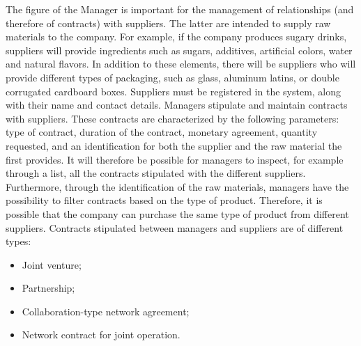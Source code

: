 The figure of the Manager is important for the management of relationships (and therefore of contracts) with suppliers. The latter are intended to supply raw materials to the company. For example, if the company produces sugary drinks, suppliers will provide ingredients such as sugars, additives, artificial colors, water and natural flavors. In addition to these elements, there will be suppliers who will provide different types of packaging, such as glass, aluminum latins, or double corrugated cardboard boxes. Suppliers must be registered in the system, along with their name and contact details. Managers stipulate and maintain contracts with suppliers. These contracts are characterized by the following parameters: type of contract, duration of the contract, monetary agreement, quantity requested, and an identification for both the supplier and the raw material the first provides. It will therefore be possible for managers to inspect, for example through a list, all the contracts stipulated with the different suppliers. Furthermore, through the identification of the raw materials, managers have the possibility to filter contracts based on the type of product. Therefore, it is possible that the company can purchase the same type of product from different suppliers. Contracts stipulated between managers and suppliers are of different types:
\begin{itemize}
    \item Joint venture;
    \item Partnership;
    \item Collaboration-type network agreement;
    \item Network contract for joint operation.
\end{itemize}
